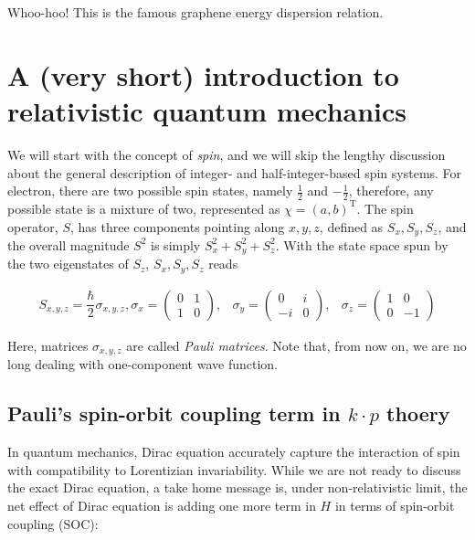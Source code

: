\documentclass{article}
\begin{document}
Whoo-hoo! This is the famous graphene energy dispersion relation.

\section{A (very short) introduction to relativistic quantum mechanics}
We will start with the concept of \textit{spin}, and we will skip the lengthy discussion about the general description of integer- and half-integer-based spin systems. For electron, there are two possible spin states, namely $\frac{1}{2}$ and $-\frac{1}{2}$, therefore, any possible state is a mixture of two, represented as $\chi=(a,b)^{\text{T}}$. The spin operator, $S$, has three components pointing along $x,y,z$, defined as $S_x, S_y, S_z$, and the overall magnitude $S^2$ is simply $S^2_x+S^2_y+S^2_z$. With the state space spun by the two eigenstates of $S_z$, $S_x, S_y, S_z$ reads

\begin{equation}
    \begin{array}{lll}  S_{x,y,z} = \dfrac{\hbar}{2} \sigma_{x,y,z}, \sigma_x = \left(\begin{array}{cc}    0 & 1\\    1 & 0  \end{array}\right), & \sigma_y = \left(\begin{array}{cc}    0 & i\\    - i & 0  \end{array}\right), & \sigma_z = \left(\begin{array}{cc}    1 & 0\\    0 & - 1  \end{array}\right)\end{array}
\end{equation}

Here, matrices $\sigma_{x,y,z}$ are called \textit{Pauli matrices}. Note that, from now on, we are no long dealing with one-component wave function.

\subsection{Pauli's spin-orbit coupling term in $k\cdot p$ thoery}

In quantum mechanics, Dirac equation accurately capture the interaction of spin with compatibility to Lorentizian invariability. While we are not ready to discuss the exact Dirac equation, a take home message is, under non-relativistic limit, the net effect of Dirac equation is adding one more term in $H$ in terms of spin-orbit coupling (SOC):
\end{document}

